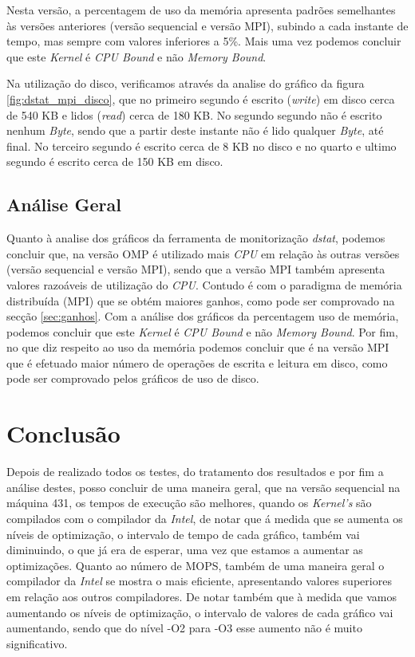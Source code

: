 \documentclass[conference,compsoc]{IEEEtran}
\begin{document}
Nesta versão, a percentagem de uso da memória apresenta padrões semelhantes às versões anteriores (versão sequencial e versão MPI), subindo a cada instante de tempo, mas sempre com valores inferiores a 5\%. Mais uma vez podemos concluir que este \textit{Kernel} é \textit{CPU Bound} e não \textit{Memory Bound}.

Na utilização do disco, verificamos através da analise do gráfico da figura \ref{fig:dstat_mpi_disco}, que no primeiro segundo é escrito (\textit{write}) em disco cerca de 540 KB e lidos (\textit{read}) cerca de 180 KB. No segundo segundo não é escrito nenhum \textit{Byte}, sendo que a partir deste instante não é lido qualquer \textit{Byte}, até final. No terceiro segundo é escrito cerca de 8 KB no disco e no quarto e ultimo segundo é escrito cerca de 150 KB em disco.

\subsection{Análise Geral}
Quanto à analise dos gráficos da ferramenta de monitorização \textit{dstat}, podemos concluir que, na versão OMP é utilizado mais \textit{CPU} em relação às outras versões (versão sequencial e versão MPI), sendo que a versão MPI também apresenta valores razoáveis de utilização do \textit{CPU}. Contudo é com o paradigma de memória distribuída (MPI) que se obtém maiores ganhos, como pode ser comprovado na secção \ref{sec:ganhos}.
Com a análise dos gráficos da percentagem uso de memória, podemos concluir que este \textit{Kernel} é \textit{CPU Bound} e não \textit{Memory Bound}.
Por fim, no que diz respeito ao uso da memória podemos concluir que é na versão MPI que é efetuado maior número de operações de escrita e leitura em disco, como pode ser comprovado pelos gráficos de uso de disco.

\section{Conclusão}
Depois de realizado todos os testes, do tratamento dos resultados e por fim a análise destes, posso concluir de uma maneira geral, que na versão sequencial na máquina 431, os tempos de execução são melhores, quando os \textit{Kernel's} são compilados com o compilador da \textit{Intel}, de notar que á medida que se aumenta os níveis de optimização, o intervalo de tempo de cada gráfico, também vai diminuindo, o que já era de esperar, uma vez que estamos a aumentar as optimizações. Quanto ao número de MOPS, também de uma maneira geral o compilador da \textit{Intel} se mostra o mais eficiente, apresentando valores superiores em relação aos outros compiladores. De notar também que à medida que vamos aumentando os níveis de optimização, o intervalo de valores de cada gráfico vai aumentando, sendo que do nível -O2 para -O3 esse aumento não é muito significativo.
\end{document}
